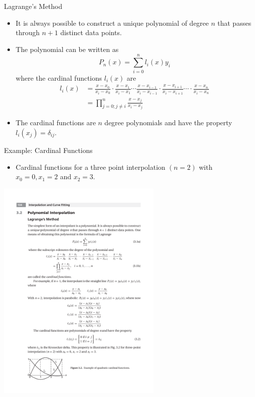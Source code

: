 \documentclass{beamer}
\begin{document}
\begin{frame}{Lagrange's Method}
\begin{itemize}
\item It is always possible to construct a \alert{unique} polynomial of degree $n$ that passes through $n + 1$ distinct data points.
\item The polynomial can be written as
\[
 P_n(x)=\sum_{i=0}^n l_i(x) y_i
\]
where the \alert{cardinal functions} $l_i(x)$ are
\begin{align}
\nonumber
l_i(x)&=\frac{x-x_0}{x_i-x_0}\cdot \frac{x-x_1}{x_i-x_1}\cdots \frac{x-x_{i-1}}{x_i-x_{i-1}}\cdot \frac{x-x_{i+1}}{x_i-x_{i+1}}\cdots\cdot \frac{x-x_n}{x_i-x_n}\\
&=\prod_{j=0;j\ne i}^n \frac{x-x_j}{x_i-x_j}\nonumber
\end{align} 
\item The cardinal functions are $n$ degree polynomials and have the property
$l_i(x_j)=\delta_{ij}$.
\end{itemize}
\end{frame}
\begin{frame}{Example: Cardinal Functions}
\begin{itemize}
\item Cardinal functions for a three point interpolation $(n=2)$ with $x_0=0, x_1=2$ and $x_2=3$.
\end{itemize}
\centerline{\includegraphics[width=0.6\textwidth]{Lec9_fig3}}
\end{frame}
\end{document}
